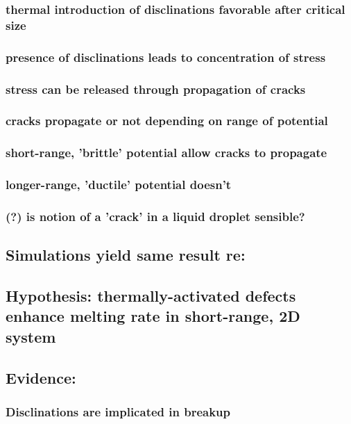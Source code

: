 \documentclass{umthesis}
\begin{document}
\subsubsection{thermal introduction of disclinations favorable after critical size}
\label{sec-2.1.3.1}
\subsubsection{presence of disclinations leads to concentration of stress}
\label{sec-2.1.3.2}
\subsubsection{stress can be released through propagation of cracks}
\label{sec-2.1.3.3}
\subsubsection{cracks propagate or not depending on range of potential}
\label{sec-2.1.3.4}
\subsubsection{short-range, 'brittle' potential allow cracks to propagate}
\label{sec-2.1.3.5}
\subsubsection{longer-range, 'ductile' potential doesn't}
\label{sec-2.1.3.6}
\subsubsection{(?) is notion of a 'crack' in a liquid droplet sensible?}
\label{sec-2.1.3.7}
\subsection{Simulations yield same result re:}
\label{sec-2.1.4}
\subsection{Hypothesis: thermally-activated defects enhance melting rate in short-range, 2D system}
\label{sec-2.1.5}
\subsection{Evidence:}
\label{sec-2.1.6}
\subsubsection{Disclinations are implicated in breakup}
\label{sec-2.1.6.1}
\end{document}
